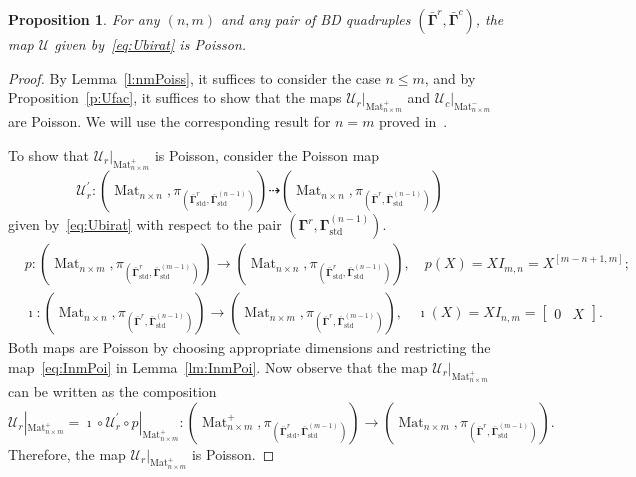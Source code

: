 \documentclass[11pt]{article}
\newcommand{\bbg}{\bar{\mathbf{\Gamma}}}
\newcommand{\bg}{\mathbf{\Gamma}}
\newcommand{\std}{\mathrm{std}}
\DeclareMathOperator{\Mat}{Mat}
\newtheorem{proposition}[theorem]{Proposition}%
\theoremstyle{definition}\newtheorem{definition}[theorem]{Definition}
\theoremstyle{definition}\newtheorem{remark}[theorem]{Remark}
\theoremstyle{remark}
\numberwithin{equation}{section}
\begin{document}
\begin{proposition}\label{p:u_poiss}
    For any $(n,m)$ and any pair of BD quadruples $(\bbg^r,\bbg^c)$, the map $\mathcal{U}$ given by~\eqref{eq:Ubirat} is Poisson.
\end{proposition}
\begin{proof}
    By Lemma~\ref{l:nmPoiss}, it suffices to consider the case $n \leq m$, and by Proposition~\ref{p:Ufac}, it suffices to show that the maps $\mathcal{U}_r|_{\Mat_{n\times m}^+}$ and $\mathcal{U}_c|_{\Mat_{n\times m}^-}$ are Poisson. We will use the corresponding result for $n=m$ proved in~\cite{gsv-unified}.

    To show that $\mathcal{U}_r|_{\Mat_{n\times m}^+}$ is Poisson, consider the Poisson map 
    \begin{equation*}
        \mathcal{U}_r^\prime :(\Mat_{n\times n},\pi_{(\bbg^r_{\std},\bbg_{\std}^{(n-1)})}) \dashrightarrow (\Mat_{n\times n},\pi_{(\bbg^r,\bbg_{\std}^{(n-1)})})
    \end{equation*}
    given by~\eqref{eq:Ubirat} with respect to the pair $(\bg^r,\bg_{\std}^{(n-1)})$.
    \begin{align*}
        &p:(\Mat_{n\times m},\pi_{(\bbg^r_{\std},\bbg_{\std}^{(m-1)})}) \rightarrow (\Mat_{n\times n}, \pi_{(\bbg^r_{\std},\bbg_{\std}^{(n-1)})}), \quad p(X) = XI_{m,n} = X^{[m-n+1,m]};\\
        &\imath : (\Mat_{n\times n},\pi_{(\bbg^r,\bbg_{\std}^{(n-1)})}) \rightarrow (\Mat_{n\times m},\pi_{(\bbg^r,\bbg_{\std}^{(m-1)})}), \quad \imath(X) = XI_{n,m} = \begin{bmatrix}
            0 & X
        \end{bmatrix}.
    \end{align*}
    Both maps are Poisson by choosing appropriate dimensions and restricting the map~\eqref{eq:InmPoi} in Lemma~\ref{lm:InmPoi}. Now observe that the map $\mathcal{U}_r|_{\Mat_{n\times m}^+}$ can be written as the composition
    \begin{equation*}
        \mathcal{U}_r|_{\Mat_{n\times m}^+} = \imath \circ \mathcal{U}_r^\prime \circ p|_{\Mat_{n\times m}^+} : (\Mat_{n\times m}^+,\pi_{(\bbg^r_{\std},\bbg_{\std}^{(m-1)})}) \rightarrow (\Mat_{n \times m},\pi_{(\bbg^r,\bbg_{\std}^{(m-1)})}).
    \end{equation*}
    Therefore, the map $\mathcal{U}_r|_{\Mat_{n\times m}^+}$ is Poisson.


\end{proof}
\end{document}
